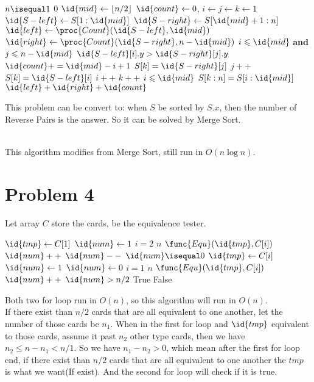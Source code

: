 \documentclass{article}
\newcommand{\floor}[1]{\left\lfloor #1 \right\rfloor}
\begin{document}
\begin{codebox}
\li \If $n\isequal 1$
\li \Then \Return $0$
    \End
\zi
\li $\id{mid} \gets \floor{n/2}$
\li $\id{count}\gets 0$, $i \gets j \gets k \gets 1$
\li $\id{S-left} \gets S[1:\id{mid}]$
\li $\id{S-right} \gets S[\id{mid}+1:n]$
\li $\id{left} \gets \proc{Count}(\id{S-left}, \id{mid})$
\li $\id{right} \gets \proc{Count}(\id{S-right}, n-\id{mid})$
\zi
\li \While $i \leqslant \id{mid}$ \textbf{and} $j \leqslant n-\id{mid}$
\li \Do \If $\id{S-left}[i].y>\id{S-right}[j].y$
\li     \Then $\id{count}+=\id{mid}-i+1$
\li         $S[k]=\id{S-right}[j]$
\li         $j++$
\li     \Else 
\li         $S[k]=\id{S-left}[i]$
\li         $i++$
        \End
\li     $k++$
    \End
\li \If $i\leqslant \id{mid}$
\li \Then $S[k:n]=S[i:\id{mid}]$
    \End
\zi
\li \Return $\id{left}+\id{right}+\id{count}$
\end{codebox}
This problem can be convert to: when $S$ be sorted by $S.x$, 
then the number of Reverse Pairs is the answer. 
So it can be solved by Merge Sort.

~\\
\noindent
This algorithm modifies from Merge Sort, still run in $O(n\log n)$.

\pagebreak
\section*{Problem 4}
Let array $C$ store the cards,  be the equivalence tester.
\begin{codebox}
\li $\id{tmp} \gets C[1]$
\li $\id{num} \gets 1$
\li \For $i=2$ \To $n$
\li \Do \If $\func{Equ}(\id{tmp}, C[i])$
\li     \Then $\id{num}++$
\li     \Else
\li         $\id{num}--$
\li         \If $\id{num}\isequal 0$
\li         \Then $\id{tmp}\gets C[i]$
\li             $\id{num}\gets 1$
            \End
        \End
    \End
\li $\id{num}\gets 0$
\li \For $i=1$ \To $n$
\li \Do \If $\func{Equ}(\id{tmp}, C[i])$
\li     \Then $\id{num}++$
        \End
    \End
\li \If $\id{num}> n/2$
\li \Then \Return True
\li \Else
\li \Return False
\end{codebox}
Both two for loop run in $O(n)$, so this algorithm will run in $O(n)$.\\

\noindent
If there exist than $n/2$ cards that are all equivalent to one another, let the number of those cards be $n_1$. 
When in the first for loop and $\id{tmp}$ equivalent to those cards, 
assume it past $n_2$ other type cards, then we have $n_2\leqslant n-n_1<n/1$.
So we have $n_1-n_2>0$, which mean after the first for loop end, 
if there exist than $n/2$ cards that are all equivalent to one another
the $tmp$ is what we want(If exist). 
And the second for loop will check if it is true.
\end{document}

